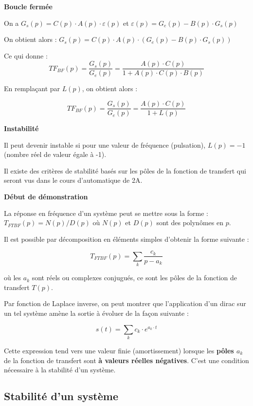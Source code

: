 \documentclass[a4paper,french]{paper}
\begin{document}
\textbf{\large Boucle fermée}

On a $G_s(p) = C(p) \cdot A(p) \cdot \varepsilon(p)$ et $\varepsilon(p) = G_e(p) - B(p) \cdot G_s(p)$
			
On obtient alors : $G_s(p) = C(p) \cdot A(p) \cdot ( G_e(p) - B(p) \cdot G_s(p) )$
			
Ce qui donne : $$TF_{BF}(p) = \frac{G_s(p)}{G_e(p)} = \frac{A(p) \cdot C(p)}{1 + A(p) \cdot C(p) \cdot B(p)} $$

\qquad

En remplaçant par $L(p)$, on obtient alors : 

$$TF_{BF}(p) = \frac{G_s(p)}{G_e(p)} = \frac{A(p) \cdot C(p)}{1 + L(p)} $$


\textbf{\large Instabilité}

Il peut devenir instable si pour une valeur de fréquence (pulsation), $L(p) = -1$ (nombre réel de valeur égale à -1).
			
Il existe des critères de stabilité basés sur les pôles de la fonction de transfert qui seront vus dans le cours d'automatique de 2A.
			
\medskip
			
\textbf{Début de démonstration}
			
La réponse en fréquence d'un système peut se mettre sous la forme : $T_{FTBF}(p) = N(p) / D(p)$ où $N(p)$ et $D(p)$ sont des polynômes en $p$.
			
Il est possible par décomposition en éléments simples d'obtenir la forme suivante : 
			
$$T_{FTBF}(p) = \sum_k \frac{c_k}{p - a_k}$$
			
où les $a_k$ sont réels ou complexes conjugués, ce sont les pôles de la fonction de transfert $T(p)$.

\medskip

Par fonction de Laplace inverse, on peut montrer que l'application d'un dirac sur un tel système amène la sortie à évoluer de la façon suivante :
			
$$s(t) = \sum_k c_k \cdot e^{a_k \cdot t}$$
			
Cette expression tend vers une valeur finie (amortissement) lorsque les \textbf{pôles $a_k$} de la fonction de transfert sont \textbf{à valeurs réelles négatives}. C'est une condition nécessaire à la stabilité d'un système.


\newpage
\subsection*{Stabilité d'un système}
\end{document}
